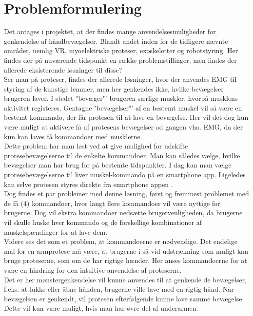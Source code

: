 \thispagestyle{fancy}
\chapter{Problemformulering}
\label{chp:problemformulering}

Det antages i projektet, at der findes mange anvendelsesmuligheder for genkendelse af håndbevægelser. Blandt andet inden for de tidligere nævnte områder, nemlig VR, myoelektriske proteser, exoskeletter og robotstyring. Her findes der på nuværende tidspunkt en række problemstillinger, men findes der allerede eksisterende løsninger til disse?\\

Ser man på proteser, findes der allerede løsninger, hvor der anvendes EMG til styring af de kunstige lemmer, men her genkendes ikke, hvilke bevægelser brugeren laver. I stedet "bevæger"' brugeren særlige muskler, hvorpå musklens aktivitet registeres. Gentagne "bevægelser"' af en bestemt muskel vil så være en bestemt kommando, der får protesen til at lave en bevægelse. Her vil det dog kun være muligt at aktivere få af protesens bevægelser ad gangen vha. EMG, da der kun kan laves få kommandoer med musklerne. \\

Dette problem har man løst ved at give mulighed for udskifte protesebevægelserne til de enkelte kommandoer. Man kan således vælge, hvilke bevægelser man har brug for på bestemte tidspunkter. I dag kan man vælge protesebevægelserne til hver muskel-kommando på en smartphone app. Ligeledes kan selve protesen styres direkte fra smartphone appen \citep{RefWorks:12}.\\
Dog findes et par problemer med denne løsning, først og fremmest problemet med de få (4) kommandoer, hvor langt flere kommandoer vil være nyttige for brugerne. Dog vil ekstra kommandoer nedsætte brugervenligheden, da brugerne vil skulle huske hver kommando og de forskellige kombinationer af muskelspændinger for at lave dem.\\

Videre ses det som et problem, at kommandoerne er nødvendige. Det endelige mål for en armprotese må være, at brugerne i så vid udstrækning som muligt kan bruge proteserne, som om de har rigtige hænder. Her anses kommandoerne for at være en hindring for den intuitive anvendelse af proteserne.\\

Det er her mønstergenkendelse vil kunne anvendes til at genkende de bevægelser, f.eks. at lukke eller åbne hånden, brugerne ville lave med en rigtig hånd. Når bevægelsen er genkendt, vil protesen efterfølgende kunne lave samme bevægelse. Dette vil kun være muligt, hvis man har øvre del af underarmen. \\

